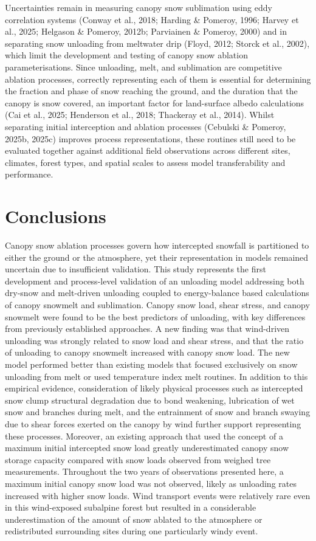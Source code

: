 \documentclass[
]{agujournal2019}
\begin{document}
Uncertainties remain in measuring canopy snow sublimation using eddy
correlation systems (Conway et al., 2018; Harding \& Pomeroy, 1996;
Harvey et al., 2025; Helgason \& Pomeroy, 2012b; Parviainen \& Pomeroy,
2000) and in separating snow unloading from meltwater drip (Floyd, 2012;
Storck et al., 2002), which limit the development and testing of canopy
snow ablation parameterisations. Since unloading, melt, and sublimation
are competitive ablation processes, correctly representing each of them
is essential for determining the fraction and phase of snow reaching the
ground, and the duration that the canopy is snow covered, an important
factor for land-surface albedo calculations (Cai et al., 2025; Henderson
et al., 2018; Thackeray et al., 2014). Whilst separating initial
interception and ablation processes (Cebulski \& Pomeroy, 2025b, 2025c)
improves process representations, these routines still need to be
evaluated together against additional field observations across
different sites, climates, forest types, and spatial scales to assess
model transferability and performance.

\section{Conclusions}\label{conclusions}

Canopy snow ablation processes govern how intercepted snowfall is
partitioned to either the ground or the atmosphere, yet their
representation in models remained uncertain due to insufficient
validation. This study represents the first development and
process-level validation of an unloading model addressing both dry-snow
and melt-driven unloading coupled to energy-balance based calculations
of canopy snowmelt and sublimation. Canopy snow load, shear stress, and
canopy snowmelt were found to be the best predictors of unloading, with
key differences from previously established approaches. A new finding
was that wind-driven unloading was strongly related to snow load and
shear stress, and that the ratio of unloading to canopy snowmelt
increased with canopy snow load. The new model performed better than
existing models that focused exclusively on snow unloading from melt or
used temperature index melt routines. In addition to this empirical
evidence, consideration of likely physical processes such as intercepted
snow clump structural degradation due to bond weakening, lubrication of
wet snow and branches during melt, and the entrainment of snow and
branch swaying due to shear forces exerted on the canopy by wind further
support representing these processes. Moreover, an existing approach
that used the concept of a maximum initial intercepted snow load greatly
underestimated canopy snow storage capacity compared with snow loads
observed from weighed tree measurements. Throughout the two years of
observations presented here, a maximum initial canopy snow load was not
observed, likely as unloading rates increased with higher snow loads.
Wind transport events were relatively rare even in this wind-exposed
subalpine forest but resulted in a considerable underestimation of the
amount of snow ablated to the atmosphere or redistributed surrounding
sites during one particularly windy event.
\end{document}
